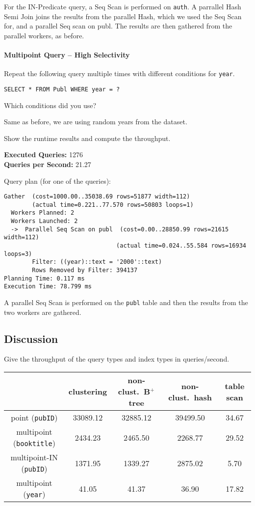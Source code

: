 \documentclass[11pt]{scrartcl}
\begin{document}
For the IN-Predicate query, a Seq Scan is performed on \texttt{auth}.
A parrallel Hash Semi Join joins the results from the parallel Hash, which we used the Seq Scan for, and a parallel Seq
scan on publ.
The results are then gathered from the parallel workers, as before.

\paragraph{Multipoint Query -- High Selectivity}

Repeat the following query multiple times with different conditions for \texttt{year}.

\begin{lstlisting}[style=dbtsql]
SELECT * FROM Publ WHERE year = ?
\end{lstlisting}

Which conditions did you use?

Same as before, we are using random years from the dataset.

Show the runtime results and compute the throughput.

\textbf{Executed Queries: } 1276\\
\textbf{Queries per Second: } 21.27

Query plan (for one of the queries):

{\small
\parskip0pt\begin{verbatim}
Gather  (cost=1000.00..35038.69 rows=51877 width=112)
        (actual time=0.221..77.570 rows=50803 loops=1)
  Workers Planned: 2
  Workers Launched: 2
  ->  Parallel Seq Scan on publ  (cost=0.00..28850.99 rows=21615 width=112)
                                (actual time=0.024..55.584 rows=16934 loops=3)
        Filter: ((year)::text = '2000'::text)
        Rows Removed by Filter: 394137
Planning Time: 0.117 ms
Execution Time: 78.799 ms
\end{verbatim}}

A parallel Seq Scan is performed on the \texttt{publ} table and then the results from the two workers are gathered.

\subsection*{Discussion}

Give the throughput of the query types and index types in queries/second.
\begin{table}[H]
  \centering
  \begin{tabular}{c|c|c|c|c}
    & clustering & non-clust.\ B$^+$ tree & non-clust.\ hash & table scan
      \tabularnewline
    \hline
    point (\texttt{pubID}) & 33089.12 & 32885.12 & 39499.50 & 34.67 \tabularnewline
    \hline
    multipoint (\texttt{booktitle}) & 2434.23 & 2465.50 & 2268.77 & 29.52
      \tabularnewline
    \hline
		multipoint-IN (\texttt{pubID}) & 1371.95 & 1339.27 & 2875.02 & 5.70
      \tabularnewline
		\hline
    multipoint (\texttt{year}) & 41.05 & 41.37 & 36.90 & 17.82
      \tabularnewline
  \end{tabular}
\end{table}
\end{document}
